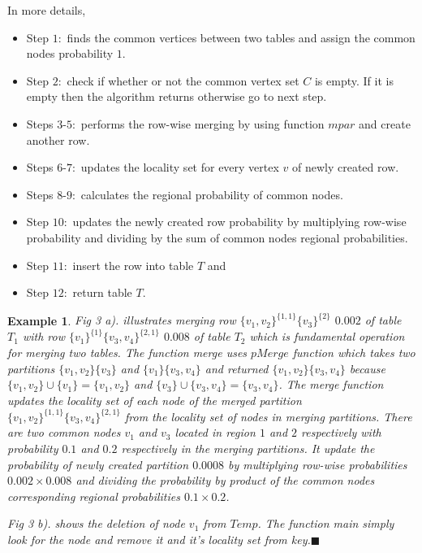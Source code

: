 \documentclass[12pt]{article}
\newtheorem{exmp}{Example}[section]
\begin{document}
In more details, 
\begin{itemize}[noitemsep,nolistsep]
\item Step $1:$ finds the common vertices between two tables  and assign the common nodes probability $1$.
\item Step $2:$  check if whether or not the common vertex set $C$ is empty. If it is empty then the algorithm returns otherwise go to next step. 
\item Steps $3$-$5:$  performs the row-wise merging by using function $mpar$ and create another row.
\item  Steps $6$-$7:$ updates the locality set for every vertex $v$ of newly created row. 
\item Steps $8$-$9:$ calculates the regional probability of common nodes. 
\item Step $10:$ updates the newly created row probability by multiplying row-wise probability and dividing by the sum of common nodes regional probabilities. 
\item Step $11:$ insert the row into table $T$ and 
\item Step $12:$ return table $T$.
\end{itemize}
\begin{exmp}
\normalfont
Fig 3 a). illustrates merging row  $\{v_1,v_2\}^{\{1,1\}}\{v_3\}^{\{2\}}$ $0.002$ of table $T_1$ with row $\{v_1\}^{\{1\}}\{v_3,v_4\}^{\{2,1\}}$ $0.008$ of table $T_2$ which is fundamental operation for merging two tables. The function merge uses $pMerge$ function which takes two partitions $\{v_1,v_2\}\{v_3\}$ and $\{v_1\}\{v_3,v_4\}$ and returned $\{v_1,v_2\}\{v_3,v_4\}$ because $\{v_1,v_2\}\cup \{v_1\}=\{v_1,v_2\}$ and $\{v_3\}\cup \{v_3,v_4\}=\{v_3,v_4\}$. The merge function updates the locality set of each node of the merged partition $\{v_1,v_2\}^{\{1,1\}}\{v_3,v_4\}^{\{2,1\}}$ from the locality set of nodes in merging partitions. There are two common nodes $v_1$ and $v_3$ located in region $1$ and $2$ respectively with probability $0.1$ and $0.2$ respectively in the merging partitions. It update the probability of newly created partition $0.0008$ by multiplying row-wise probabilities $0.002\times 0.008$ and dividing the probability by product of the common nodes corresponding regional probabilities $0.1\times 0.2$.

Fig 3 b). shows the deletion of node $v_1$ from $Temp$. The function main simply look for the node and remove it and it's locality set from key.$\blacksquare$
\end{exmp}
\end{document}
